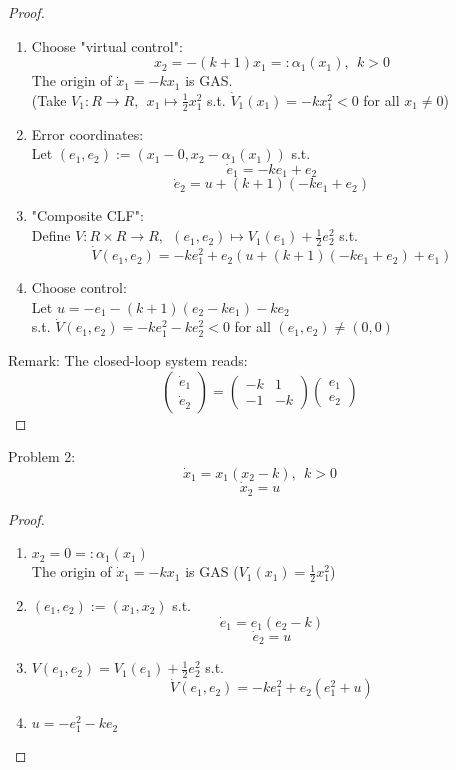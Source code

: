     \begin{proof}
        \begin{enumerate}
            \item Choose "virtual control":\\
            $$x_2 = -(k+1)x_1 =: \alpha_1(x_1), \ \ k>0$$
            The origin of $\dot x_1 = -kx_1$ is GAS. \\
            (Take $V_1: R \rightarrow R, \ \ x_1 \mapsto \frac{1}{2}x_1^2$ s.t. $\dot V_1(x_1) = -kx_1^2 < 0$ for all $x_1 \neq 0$)
            \item Error coordinates:\\
            Let $(e_1,e_2):=(x_1-0,x_2-\alpha_1(x_1))$ s.t.
            $$\dot e_1 = -ke_1+e_2$$
            $$\dot e_2 = u+(k+1)(-ke_1+e_2)$$
            \item "Composite CLF":\\
            Define $V:R \times R \rightarrow R, \ \ (e_1,e_2) \mapsto V_1(e_1)+\frac{1}{2}e_2^2$ s.t.
            $$\dot V (e_1,e_2) = -ke_1^2 + e_2(u+(k+1)(-ke_1+e_2)+e_1)$$
            \item Choose control:\\
            Let $u = -e_1-(k+1)(e_2-ke_1)-ke_2$ \\
            s.t. $\dot V(e_1,e_2) = -ke_1^2-ke_2^2 < 0$ for all $(e_1,e_2) \neq (0,0)$
        \end{enumerate} 
        
        Remark: The closed-loop system reads:
        $$\begin{pmatrix}
        \dot e_1 \\
        \dot e_2
        \end{pmatrix}
        =
        \begin{pmatrix}
            -k & 1 \\
            -1 & -k
        \end{pmatrix}
        \begin{pmatrix}
            e_1 \\
            e_2
        \end{pmatrix}$$
    \end{proof}
    
    Problem 2:
    $$\dot x_1 = x_1(x_2-k), \ \ k>0$$
    $$\dot x_2 = u$$
    \begin{proof}
        \begin{enumerate}
            \item $x_2 = 0 =: \alpha_1(x_1)$ \\
            The origin of $\dot x_1 = -kx_1$ is GAS ($V_1(x_1) = \frac{1}{2}x_1^2$)
            \item $(e_1,e_2) := (x_1,x_2)$ s.t.
            $$\dot e_1 = e_1(e_2-k)$$
            $$\dot e_2 = u$$
            \item $V(e_1,e_2) = V_1(e_1)+\frac{1}{2}e_2^2$ s.t. \\
            $$\dot V(e_1,e_2) = -ke_1^2 + e_2(e_1^2+u)$$
            \item $u=-e_1^2-ke_2$
        \end{enumerate}
    \end{proof}
    
